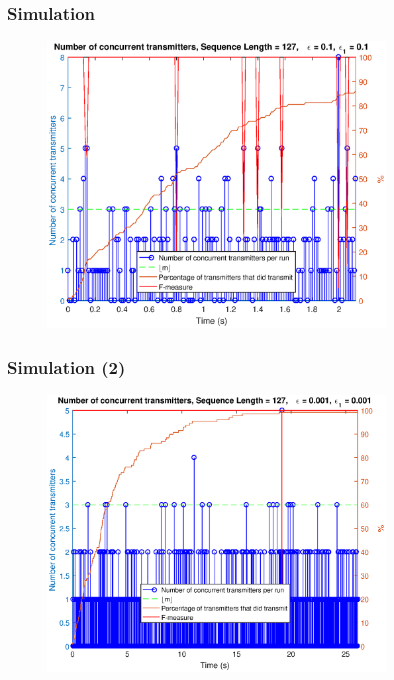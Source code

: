 \documentclass{beamer}
\begin{document}
	\begin{frame}\frametitle{Simulation}
		
		\begin{figure}[t]
			\centering
			\includegraphics[width=0.8\textwidth]{simulation-1.eps}
		\end{figure}


	\end{frame}

	\begin{frame}\frametitle{Simulation (2)}
		
		\begin{figure}[t]
			\centering
			\includegraphics[width=0.8\textwidth]{simulation-2.eps}
		\end{figure}



	\end{frame}
\end{document}

